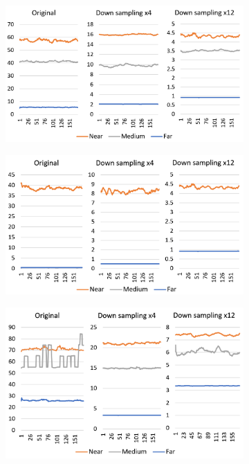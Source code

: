 \documentclass[10pt,a4paper,twocolumn,twoside]{article}
\begin{document}
	\begin{figure}
		\centering
		\begin{subfigure}[t]{0.5\textwidth}
			\centering
			\includegraphics[width=\linewidth]{img/mean2.png}
		\end{subfigure}%
		\vspace{0.1cm}
		\begin{subfigure}[t]{0.5\textwidth}
			\centering
			\includegraphics[width=\linewidth]{img/min2.png}
		\end{subfigure}
		\vspace{0.1cm}
		\begin{subfigure}[t]{0.5\textwidth}
			\centering
			\includegraphics[width=\linewidth]{img/max2.png}

\end{subfigure}
\end{figure}
\end{document}
